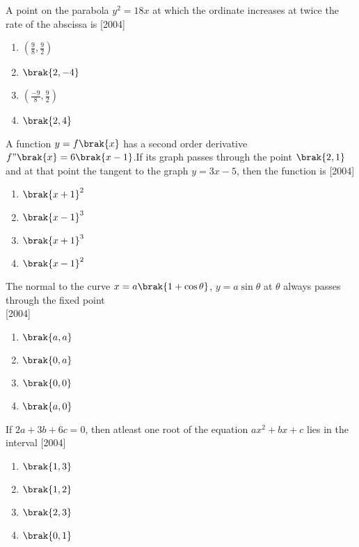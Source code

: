 \item A point on the parabola $y^2=18x$ at which the ordinate increases at twice the rate of the abscissa is \hfill{[2004]}
\begin{multicols}{2}
\begin{enumerate}
    \item $(\frac{9}{8},\frac{9}{2})$
    \item $\brak{2,-4}$
    \item $(\frac{-9}{8},\frac{9}{2})$
    \item $\brak{2,4}$
\end{enumerate}
\end{multicols}
\item A function $y=f\brak{x}$ has a second order derivative $f"\brak{x}=6\brak{x-1}$.If its graph passes through the point $\brak{2,1}$ and at that point the tangent to the graph $y=3x-5$, then the function is \hfill{[2004]}
\begin{multicols}{2}
\begin{enumerate}
    \item $\brak{x+1}^2$
    \item $\brak{x-1}^3$
    \item $\brak{x+1}^3$
    \item $\brak{x-1}^2$
\end{enumerate}
\end{multicols}
\item The normal to the curve $x=a\brak{1+\cos\theta}$, $y=a \sin\theta$ at $\theta$ always passes through the fixed point\\ \hfill{[2004]}
\begin{multicols}{2}
\begin{enumerate}
    \item $\brak{a,a}$
    \item $\brak{0,a}$
    \item $\brak{0,0}$
    \item $\brak{a,0}$
\end{enumerate}
\end{multicols}
\item If $2a+3b+6c=0$, then atleast one root of the equation $ax^2+bx+c$ lies in the interval \hfill{[2004]}
\begin{multicols}{2}
\begin{enumerate}
    \item $\brak{1,3}$
    \item $\brak{1,2}$
    \item $\brak{2,3}$
    \item $\brak{0,1}$
\end{enumerate}
\end{multicols}  
